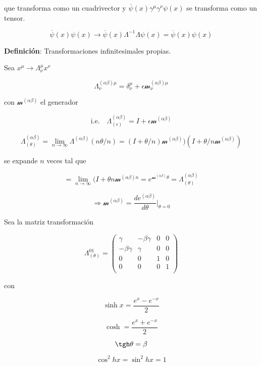 \documentclass{report}
\begin{document}
que transforma como un cuadrivector y $\overline{\psi} (x) \gamma^{\mu} \gamma^{\nu} \psi (x)$ se transforma como un tensor.

\[\overline{\psi} (x) \psi (x) \rightarrow \overline{\psi}(x)\Lambda^{-1} \Lambda \psi (x) = \overline{\psi} (x) \psi (x)\]

\textbf{Definición}: Transformaciones infinitesimales propias.

Sea $x^{\mu} \rightarrow \Lambda_{\nu}^{\mu} x^{\nu}$

\begin{equation}
\Lambda^{(\alpha \beta) \mu} _{\nu} = \delta_{\nu}^{\mu} + \epsilon \mathscr{m}^{(\alpha \beta) \mu}_{\nu}
\end{equation}

con $\mathscr{m}^{(\alpha \beta)}$ el generador

\[\text{i.e.} \quad \Lambda^{(\alpha \beta)}_{(\epsilon)} =  I + \epsilon \mathscr{m}^{(\alpha \beta)}\]

\[\Lambda_{(\theta)}^{(\alpha \beta)} = \lim _{n \to \infty} \Lambda^{(\alpha \beta)} (n \theta /n) = (I + \theta/n) \mathscr{m}^{(\alpha \beta)}) (I + \theta / n \mathscr{m}^{(\alpha \beta)})\]

se expande $n$ veces tal que

\begin{equation}
= \lim_{n \to \infty} (I + \theta n \mathscr{m}^{(\alpha \beta) n} = e^{\mathscr{m}^{(\alpha \beta)} \theta} = \Lambda_{(\theta)}^{(\alpha \beta)}
\end{equation}

\[\Rightarrow \mathscr{m}^{(\alpha \beta)} = \frac{de^{(\alpha \beta)}}{d \theta} |_{\theta = 0}\]

Sea la matriz transformación

\[\Lambda_{(\theta)}^{01} = \left ( \begin{array}{cccc}
 \gamma & -\beta \gamma & 0& 0 \\
 -\beta \gamma & \gamma & 0 &0 \\
0 & 0 & 1 &0 \\
0 & 0 & 0 &1 \\ \end{array} \right) 
\]

con

\[\sinh x = \frac{e^x - e^{-x}}{2}\]

\[\cosh = \frac{e^x + e^{-x}}{2}\]

\[\tgh \theta = \beta\]

\[\cos^2 h x = \sin^2 hx = 1\]
\end{document}
